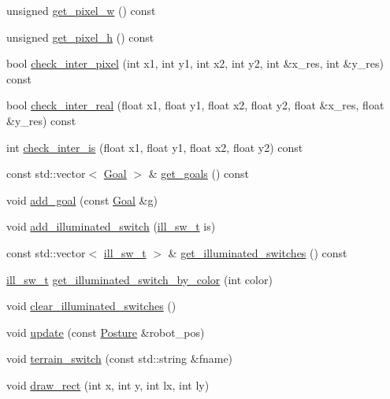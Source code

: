 \begin{DoxyCompactItemize}
\item 
unsigned \hyperlink{classfastsim_1_1_map_a83707b83c40237ac6d4e7e7844de60dd}{get\+\_\+pixel\+\_\+w} () const 
\item 
unsigned \hyperlink{classfastsim_1_1_map_ac32da6d26f3f313dcd565bf42da6029a}{get\+\_\+pixel\+\_\+h} () const 
\item 
bool \hyperlink{classfastsim_1_1_map_ab7de43b86fddf43ac557265ef8f202fc}{check\+\_\+inter\+\_\+pixel} (int x1, int y1, int x2, int y2, int \&x\+\_\+res, int \&y\+\_\+res) const 
\item 
bool \hyperlink{classfastsim_1_1_map_a368442a2dc58f7a44a158b7dcb21fd78}{check\+\_\+inter\+\_\+real} (float x1, float y1, float x2, float y2, float \&x\+\_\+res, float \&y\+\_\+res) const 
\item 
int \hyperlink{classfastsim_1_1_map_a5ff4da13edd8ef65a230bea27b29540e}{check\+\_\+inter\+\_\+is} (float x1, float y1, float x2, float y2) const 
\item 
const std\+::vector$<$ \hyperlink{classfastsim_1_1_goal}{Goal} $>$ \& \hyperlink{classfastsim_1_1_map_a6ebb48de4447614127109d3260a1956a}{get\+\_\+goals} () const 
\item 
void \hyperlink{classfastsim_1_1_map_a6fd705dfcf8bf3afe714b9122020efe1}{add\+\_\+goal} (const \hyperlink{classfastsim_1_1_goal}{Goal} \&g)
\item 
void \hyperlink{classfastsim_1_1_map_ac201328ee3401498cdda69a7e099eedf}{add\+\_\+illuminated\+\_\+switch} (\hyperlink{classfastsim_1_1_map_a998d356ac6ce470e714e8945150eac6e}{ill\+\_\+sw\+\_\+t} is)
\item 
const std\+::vector$<$ \hyperlink{classfastsim_1_1_map_a998d356ac6ce470e714e8945150eac6e}{ill\+\_\+sw\+\_\+t} $>$ \& \hyperlink{classfastsim_1_1_map_a14c1179ba9771e0b9f61bc3f31e0f444}{get\+\_\+illuminated\+\_\+switches} () const 
\item 
\hyperlink{classfastsim_1_1_map_a998d356ac6ce470e714e8945150eac6e}{ill\+\_\+sw\+\_\+t} \hyperlink{classfastsim_1_1_map_a8fbbc3414eb86417a2e300a9011841d6}{get\+\_\+illuminated\+\_\+switch\+\_\+by\+\_\+color} (int color)
\item 
void \hyperlink{classfastsim_1_1_map_ae16d72c639ee846c62c1632984b13e79}{clear\+\_\+illuminated\+\_\+switches} ()
\item 
void \hyperlink{classfastsim_1_1_map_a9492be2a5c6d8b56595b57f7552805bc}{update} (const \hyperlink{classfastsim_1_1_posture}{Posture} \&robot\+\_\+pos)
\item 
void \hyperlink{classfastsim_1_1_map_af6f7f13c7774f3b446ecf0358ac03af0}{terrain\+\_\+switch} (const std\+::string \&fname)
\item 
void \hyperlink{classfastsim_1_1_map_ad03b57f208d83fc7d31877b951c07f81}{draw\+\_\+rect} (int x, int y, int lx, int ly)
\end{DoxyCompactItemize}
